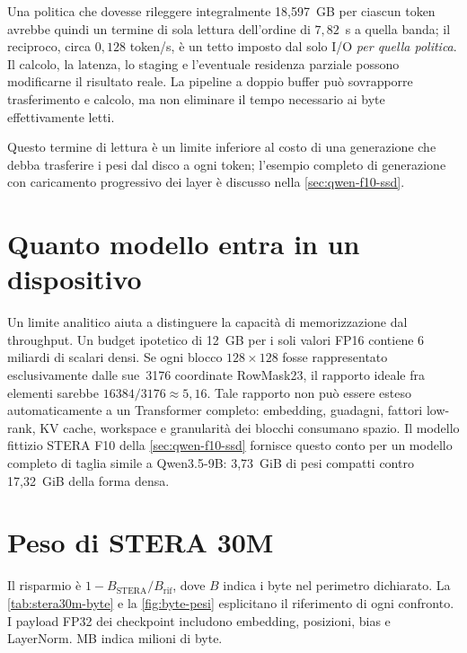 Una politica che dovesse rileggere integralmente 18,597~GB per ciascun token avrebbe quindi un termine di sola lettura dell'ordine di $7{,}82$~s a quella banda; il reciproco, circa $0{,}128$ token/s, è un tetto imposto dal solo I/O \emph{per quella politica}. Il calcolo, la latenza, lo staging e l'eventuale residenza parziale possono modificarne il risultato reale. La pipeline a doppio buffer può sovrapporre trasferimento e calcolo, ma non eliminare il tempo necessario ai byte effettivamente letti.

Questo termine di lettura è un limite inferiore al costo di una generazione che debba trasferire i pesi dal disco a ogni token; l'esempio completo di generazione con caricamento progressivo dei layer è discusso nella \autoref{sec:qwen-f10-ssd}.

\section{Quanto modello entra in un dispositivo}

Un limite analitico aiuta a distinguere la capacità di memorizzazione dal throughput. Un budget ipotetico di 12~GB per i soli valori FP16 contiene 6 miliardi di scalari densi. Se ogni blocco $128\times128$ fosse rappresentato esclusivamente dalle sue \,\num{3176} coordinate RowMask23, il rapporto ideale fra elementi sarebbe $16384/3176\approx5{,}16$. Tale rapporto non può essere esteso automaticamente a un Transformer completo: embedding, guadagni, fattori low-rank, KV cache, workspace e granularità dei blocchi consumano spazio. Il modello fittizio STERA F10 della \autoref{sec:qwen-f10-ssd} fornisce questo conto per un modello completo di taglia simile a Qwen3.5-9B: 3,73~GiB di pesi compatti contro 17,32~GiB della forma densa.

\section{Peso di STERA 30M}
\label{sec:stera30m-quantizzazione}

Il risparmio è $1-B_{\mathrm{STERA}}/B_{\mathrm{rif}}$, dove $B$ indica i byte nel perimetro dichiarato. La \autoref{tab:stera30m-byte} e la \autoref{fig:byte-pesi} esplicitano il riferimento di ogni confronto. I payload FP32 dei checkpoint includono embedding, posizioni, bias e LayerNorm. MB indica milioni di byte.

